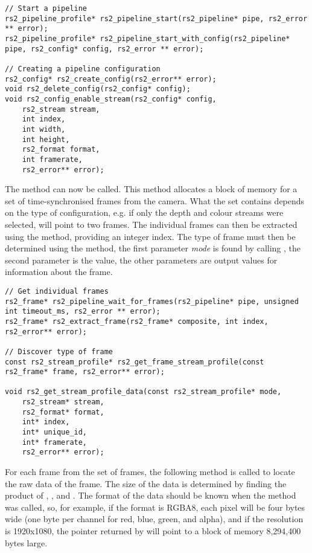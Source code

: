     \begin{lstlisting}[style=CStyle]
// Start a pipeline
rs2_pipeline_profile* rs2_pipeline_start(rs2_pipeline* pipe, rs2_error ** error);
rs2_pipeline_profile* rs2_pipeline_start_with_config(rs2_pipeline* pipe, rs2_config* config, rs2_error ** error);

// Creating a pipeline configuration
rs2_config* rs2_create_config(rs2_error** error);
void rs2_delete_config(rs2_config* config);
void rs2_config_enable_stream(rs2_config* config,
    rs2_stream stream,
    int index,
    int width,
    int height,
    rs2_format format,
    int framerate,
    rs2_error** error);\end{lstlisting}

    The  method can now be called. This method allocates a block of memory for a set of time-synchronised frames from the camera. What the set contains depends on the type of configuration, e.g. if only the depth and colour streams were selected,  will point to two frames. The individual frames can then be extracted using the  method, providing an integer index. The type of frame must then be determined using the  method, the first parameter {\slshape mode} is found by calling , the second parameter is the  value, the other parameters are output values for information about the frame.

    \begin{lstlisting}[style=CStyle]
// Get individual frames
rs2_frame* rs2_pipeline_wait_for_frames(rs2_pipeline* pipe, unsigned int timeout_ms, rs2_error ** error);
rs2_frame* rs2_extract_frame(rs2_frame* composite, int index, rs2_error** error);

// Discover type of frame
const rs2_stream_profile* rs2_get_frame_stream_profile(const rs2_frame* frame, rs2_error** error);

void rs2_get_stream_profile_data(const rs2_stream_profile* mode, 
    rs2_stream* stream, 
    rs2_format* format, 
    int* index, 
    int* unique_id, 
    int* framerate, 
    rs2_error** error);\end{lstlisting}

    For each frame from the set of frames, the following method is called to locate the raw data of the frame. The size of the data is determined by finding the product of , , and . The format of the data should be known when the  method was called, so, for example, if the format is RGBA8, each pixel will be four bytes wide (one byte per channel for red, blue, green, and alpha), and if the resolution is 1920x1080, the pointer returned by  will point to a block of memory 8,294,400 bytes large.


